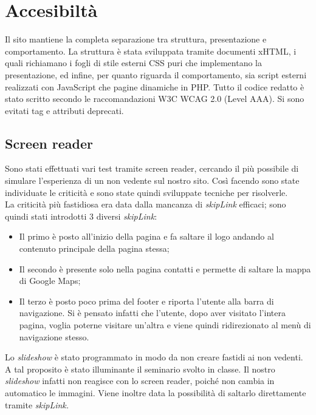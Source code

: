\section{Accesibiltà}

Il sito mantiene la completa separazione tra struttura, presentazione e comportamento. La struttura è stata sviluppata tramite documenti xHTML, i quali richiamano i fogli di stile esterni CSS puri che implementano la presentazione, ed infine, per quanto riguarda il comportamento, sia script esterni realizzati con JavaScript che pagine dinamiche in PHP.
Tutto il codice redatto è stato scritto secondo le raccomandazioni W3C WCAG 2.0 (Level AAA).
Si sono evitati tag e attributi deprecati. \\

\subsection{Screen reader}
Sono stati effettuati vari test tramite screen reader, cercando il più possibile di simulare l’esperienza di un non vedente sul nostro sito. Così facendo sono state individuate le criticità e sono state quindi sviluppate tecniche per risolverle. \\


La criticità più fastidiosa era data dalla mancanza di \textit{skipLink} efficaci;
sono quindi stati introdotti 3 diversi \textit{skipLink}:
\begin{itemize}
\item Il primo è posto all’inizio della pagina e fa saltare il logo andando al contenuto principale della pagina stessa;
\item Il secondo è presente solo nella pagina contatti e permette di saltare la mappa di Google Maps;
\item Il terzo è posto poco prima del footer e riporta l’utente alla barra di navigazione. Si è pensato infatti che l’utente, dopo aver visitato l’intera pagina, voglia poterne visitare un’altra e viene quindi ridirezionato al menù di navigazione stesso. \\ 
\end{itemize}



Lo \textit{slideshow} è stato programmato in modo da non creare fastidi ai non vedenti. A tal proposito è stato illuminante il seminario svolto in classe.
Il nostro \textit{slideshow} infatti non reagisce con lo screen reader, poiché non cambia in automatico le immagini. Viene inoltre data la possibilità di saltarlo direttamente tramite \textit{skipLink.}\\

